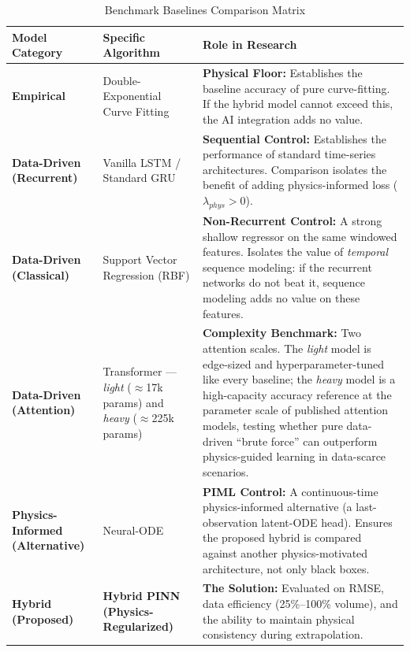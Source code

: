 \begin{table}[H]
\centering
\caption{Benchmark Baselines Comparison Matrix}
\label{tab:benchmarks}
\renewcommand{\arraystretch}{1.5}
\renewcommand{\baselinestretch}{1}
\small %
\begin{tabularx}{\textwidth}{@{} >{\raggedright\arraybackslash}p{2.8cm} >{\raggedright\arraybackslash}p{3.2cm} X @{}}
\toprule
\textbf{Model Category} & \textbf{Specific Algorithm} & \textbf{Role in Research} \\ 
\midrule

\textbf{Empirical} & Double-Exponential Curve Fitting & \textbf{Physical Floor:} Establishes the baseline accuracy of pure curve-fitting. If the hybrid model cannot exceed this, the AI integration adds no value. \\ 

\textbf{Data-Driven (Recurrent)} & Vanilla LSTM / Standard GRU & \textbf{Sequential Control:} Establishes the performance of standard time-series architectures. Comparison isolates the benefit of adding physics-informed loss ($\lambda_{phys} > 0$). \\ 

\textbf{Data-Driven (Classical)} & Support Vector Regression (RBF) & \textbf{Non-Recurrent Control:} A strong shallow regressor on the same windowed features. Isolates the value of \emph{temporal} sequence modeling: if the recurrent networks do not beat it, sequence modeling adds no value on these features. \\

\textbf{Data-Driven (Attention)} & Transformer --- \emph{light} ($\approx$17k params) and \emph{heavy} ($\approx$225k params) & \textbf{Complexity Benchmark:} Two attention scales. The \emph{light} model is edge-sized and hyperparameter-tuned like every baseline; the \emph{heavy} model is a high-capacity accuracy reference at the parameter scale of published attention models, testing whether pure data-driven ``brute force'' can outperform physics-guided learning in data-scarce scenarios. \\

\textbf{Physics-Informed (Alternative)} & Neural-ODE & \textbf{PIML Control:} A continuous-time physics-informed alternative (a last-observation latent-ODE head). Ensures the proposed hybrid is compared against another physics-motivated architecture, not only black boxes. \\

\textbf{Hybrid (Proposed)} & \textbf{Hybrid PINN (Physics-Regularized)} & \textbf{The Solution:} Evaluated on RMSE, data efficiency (25\%--100\% volume), and the ability to maintain physical consistency during extrapolation. \\

\bottomrule
\end{tabularx}
\end{table}
